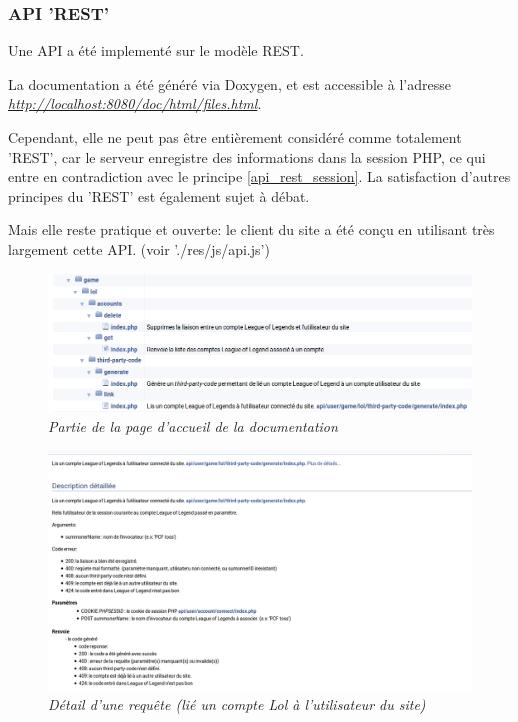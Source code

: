 \documentclass[10pt]{article}
\begin{document}
      \newpage
      \subsubsection{API 'REST'}
	Une API a été implementé sur le modèle REST.
	
	La documentation a été généré via Doxygen, et est accessible à l'adresse \href{http://localhost:8080/doc/html/files.html}{\textit{http://localhost:8080/doc/html/files.html}}.
	
	Cependant, elle ne peut pas être entièrement considéré comme totalement 'REST', car le serveur enregistre des informations dans la session PHP,
	ce qui entre en contradiction avec le principe \ref{api_rest_session}. La satisfaction d'autres principes du 'REST' est également sujet à débat.
	
	Mais elle reste pratique et ouverte: le client du site a été conçu en utilisant très largement cette API. (voir './res/js/api.js')

      \begin{figure}[H]
	\begin{center}
	  \includegraphics[width=14cm,keepaspectratio]{./images/api.png}
	\end{center}
	\caption{\textit{Partie de la page d'accueil de la documentation}}
	\label{api}
      \end{figure}
      
      \begin{figure}[H]
	\begin{center}
	  \includegraphics[width=14cm,keepaspectratio]{./images/link_account.png}
	\end{center}
	\caption{\textit{Détail d'une requête (lié un compte Lol à l'utilisateur du site)}}
	\label{link_account}
      \end{figure}
     
\end{document}
